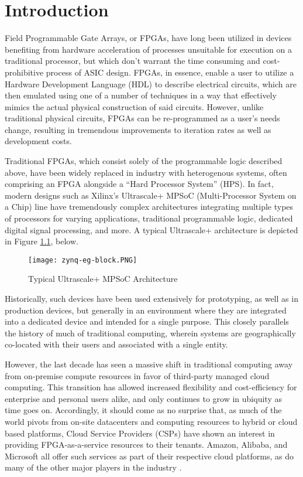 
\chapter{Introduction}\label{ch:introduction}

Field Programmable Gate Arrays, or FPGAs, have long been utilized in devices benefiting from hardware acceleration of processes unsuitable for execution on a traditional processor, but which don't warrant the time consuming and cost-prohibitive process of ASIC design. FPGAs, in essence, enable a user to utilize a Hardware Development Language (HDL) to describe electrical circuits, which are then emulated using one of a number of techniques in a way that effectively mimics the actual physical construction of said circuits. However, unlike traditional physical circuits, FPGAs can be re-programmed as a user's needs change, resulting in tremendous improvements to iteration rates as well as development costs.

Traditional FPGAs, which consist solely of the programmable logic described above, have been widely replaced in industry with heterogenous systems, often comprising an FPGA alongside a ``Hard Processor System'' (HPS). In fact, modern designs such as Xilinx's Ultrascale+ MPSoC (Multi-Processor System on a Chip) line have tremendously complex architectures integrating multiple types of processors for varying applications, traditional programmable logic, dedicated digital signal processing, and more. A typical Ultrascale+ architecture is depicted in Figure \ref{fig:ultrascale}, below.

\begin{figure}
    \centering
    \texttt{[image: zynq-eg-block.PNG]}
    \caption[Typical Ultrascale+ Architecture]{Typical Ultrascale+ MPSoC Architecture \cite{noauthor_zynq_nodate}}
    \label{fig:ultrascale}
\end{figure}

Historically, such devices have been used extensively for prototyping, as well as in production devices, but generally in an environment where they are integrated into a dedicated device and intended for a single purpose. This closely parallels the history of much of traditional computing, wherein systems are geographically co-located with their users and associated with a single entity. 

However, the last decade has seen a massive shift in traditional computing away from on-premise compute resources in favor of third-party managed cloud computing. This transition has allowed increased flexibility and cost-efficiency for enterprise and personal users alike, and only continues to grow in ubiquity as time goes on. Accordingly, it should come as no surprise that, as much of the world pivots from on-site datacenters and computing resources to hybrid or cloud based platforms, Cloud Service Providers (CSPs) have shown an interest in providing FPGA-as-a-service resources to their tenants. Amazon, Alibaba, and Microsoft all offer such services as part of their respective cloud platforms, as do many of the other major players in the industry \cite{noauthor_amazon_nodate} \cite{noauthor_deep_nodate} \cite{noauthor_alveo_nodate}. 

